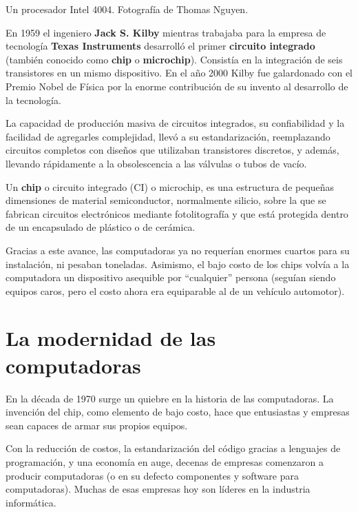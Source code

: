 {Un procesador Intel 4004.}
{Fotografía de Thomas Nguyen.}

En 1959 el ingeniero \textbf{Jack S. Kilby} mientras trabajaba para la empresa
de tecnología \textbf{Texas Instruments} desarrolló el primer \textbf{circuito
integrado} (también conocido como \textbf{chip} o \textbf{microchip}). Consistía
en la integración de seis transistores en un mismo dispositivo. En el año 2000
Kilby fue galardonado con el Premio Nobel de Física por la enorme contribución
de su invento al desarrollo de la tecnología.\autocite{reid_2001}

La capacidad de producción masiva de circuitos integrados, su confiabilidad y
la facilidad de agregarles complejidad, llevó a su estandarización, reemplazando
circuitos completos con diseños que utilizaban transistores discretos, y además,
llevando rápidamente a la obsolescencia a las válvulas o tubos de vacío.

\begin{definition}
    Un \textbf{chip} o circuito integrado (CI) o microchip, es una estructura
    de pequeñas dimensiones de material semiconductor, normalmente silicio,
    sobre la que se fabrican circuitos electrónicos mediante fotolitografía y
    que está protegida dentro de un encapsulado de plástico o de cerámica.
\end{definition}

Gracias a este avance, las computadoras ya no requerían enormes cuartos para
su instalación, ni pesaban toneladas. Asimismo, el bajo costo de los chips
volvía a la computadora un dispositivo asequible por ``cualquier'' persona
(seguían siendo equipos caros, pero el costo ahora era equiparable al de un
vehículo automotor).

\section{La modernidad de las computadoras}

En la década de 1970 surge un quiebre en la historia de las computadoras. La
invención del chip, como elemento de bajo costo, hace que entusiastas y empresas
sean capaces de armar sus propios equipos.

Con la reducción de costos, la estandarización del código gracias a lenguajes de
programación, y una economía en auge, decenas de empresas comenzaron a producir
computadoras (o en su defecto componentes y software para computadoras). Muchas
de esas empresas hoy son líderes en la industria informática.

